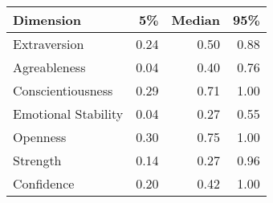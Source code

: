 \begin{tabular}{lrrr}
\toprule
           Dimension &    5\% &  Median &   95\% \\
\midrule
        Extraversion &  0.24 &    0.50 &  0.88 \\
        Agreableness &  0.04 &    0.40 &  0.76 \\
   Conscientiousness &  0.29 &    0.71 &  1.00 \\
 Emotional Stability &  0.04 &    0.27 &  0.55 \\
            Openness &  0.30 &    0.75 &  1.00 \\
            Strength &  0.14 &    0.27 &  0.96 \\
          Confidence &  0.20 &    0.42 &  1.00 \\
\bottomrule
\end{tabular}
